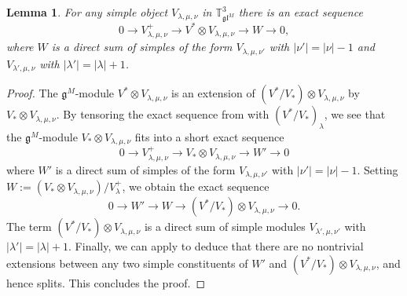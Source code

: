\documentclass[11pt]{article}
\theoremstyle{plain}
\newtheorem{lemma}{Lemma}[section]
\theoremstyle{nonumberplain}
\theoremstyle{plain}
\theoremstyle{nonumberplain}
\newtheorem{proof}{Proof}
\newcommand\bT{{\mathbb T}}
\newcommand\fg{\mathfrak{g}}
\newcommand\fgl{\mathfrak{gl}}
\begin{document}
\begin{lemma}\label{le.Kosz}
  For any simple object $V_{\lambda,\mu,\nu}$ in $\bT^3_{\fgl^M}$ there is an exact sequence
  \begin{equation*}
    0\to V_{\lambda,\mu,\nu}^+\to V^*\otimes V_{\lambda,\mu,\nu}\to W\to 0,
  \end{equation*}
where $W$ is a direct sum of simples of the form $V_{\lambda,\mu,\nu'}$ with $|\nu'|=|\nu|-1$ and $V_{\lambda',\mu,\nu}$ with $|\lambda'|=|\lambda|+1$.%
\end{lemma}
\begin{proof}
 The $\fg^M$-module $V^*\otimes V_{\lambda,\mu,\nu}$ is an extension of $(V^*/V_*)\otimes V_{\lambda,\mu,\nu}$ by $V_*\otimes V_{\lambda,\mu,\nu}$. By tensoring the exact sequence from \cite[Lemma 5.3]{DPS} with $(V^*/V_*)_{\lambda}$, we see that the $\fg^M$-module $V_*\otimes V_{\lambda,\mu,\nu}$ fits into a short exact sequence 
  \begin{equation*}
        0\to V_{\lambda,\mu,\nu}^+\to V_*\otimes V_{\lambda,\mu,\nu}\to W'\to 0
  \end{equation*}
where $W'$ is a direct sum of simples of the form $V_{\lambda,\mu,\nu'}$ with $|\nu'|=|\nu|-1$. Setting $W:=\left(V_*\otimes V_{\lambda,\mu,\nu}\right)/V_\lambda^+$, we obtain the exact sequence 
\begin{equation}\label{eq.Kosz_aux}
  0\to W'\to W\to (V^*/V_*)\otimes V_{\lambda,\mu,\nu}\to 0.  
\end{equation}
The term $ (V^*/V_*)\otimes V_{\lambda,\mu,\nu}$ is a direct sum of simple modules $V_{\lambda',\mu,\nu'}$ with $|\lambda'|=|\lambda|+1$.  Finally, we can apply  to deduce that there are no nontrivial extensions between any two simple constituents of $W'$ and $\left(V^*/V_*\right)\otimes V_{\lambda,\mu,\nu}$, and hence  splits. This concludes the proof. 
\end{proof}
\end{document}
